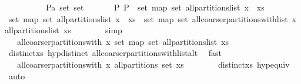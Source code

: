 \begin{isabellebody}
\ \ \isamarkupfalse%
\ \isanewline
\ \ \ \ \isamarkupfalse%
\ P{\isacharcolon}{\isacharcolon}{\isachardoublequoteopen}{\isacharprime}a\ set\ set{\isachardoublequoteclose}\ \isanewline
\ \ \ \ \isamarkupfalse%
\ P{\isacharcolon}\ {\isachardoublequoteopen}P\ {\isasymin}\ set\ {\isacharparenleft}map\ set\ {\isacharparenleft}all{\isacharunderscore}partitions{\isacharunderscore}list\ {\isacharparenleft}x\ {\isacharhash}\ xs{\isacharparenright}{\isacharparenright}{\isacharparenright}{\isachardoublequoteclose}\isanewline
\isanewline
\ \ \ \ \isamarkupfalse%
\ {\isachardoublequoteopen}set\ {\isacharparenleft}map\ set\ {\isacharparenleft}all{\isacharunderscore}partitions{\isacharunderscore}list\ {\isacharparenleft}x\ {\isacharhash}\ xs{\isacharparenright}{\isacharparenright}{\isacharparenright}\ {\isacharequal}\ set\ {\isacharparenleft}map\ set\ {\isacharparenleft}all{\isacharunderscore}coarser{\isacharunderscore}partitions{\isacharunderscore}with{\isacharunderscore}list\ x\ {\isacharparenleft}all{\isacharunderscore}partitions{\isacharunderscore}list\ xs{\isacharparenright}{\isacharparenright}{\isacharparenright}{\isachardoublequoteclose}\isanewline
\ \ \ \ \ \ \isamarkupfalse%
\ simp\isanewline
\ \ \ \ \isamarkupfalse%
\ \isamarkupfalse%
\ {\isachardoublequoteopen}{\isasymdots}\ {\isacharequal}\ all{\isacharunderscore}coarser{\isacharunderscore}partitions{\isacharunderscore}with\ x\ {\isacharparenleft}set\ {\isacharparenleft}map\ set\ {\isacharparenleft}all{\isacharunderscore}partitions{\isacharunderscore}list\ xs{\isacharparenright}{\isacharparenright}{\isacharparenright}{\isachardoublequoteclose}\isanewline
\ \ \ \ \ \ \isamarkupfalse%
\ distinct{\isacharunderscore}xs\ hyp{\isacharunderscore}distinct\ all{\isacharunderscore}coarser{\isacharunderscore}partitions{\isacharunderscore}with{\isacharunderscore}list{\isacharunderscore}alt\ \isamarkupfalse%
\ fast\isanewline
\ \ \ \ \isamarkupfalse%
\ \isamarkupfalse%
\ {\isachardoublequoteopen}{\isasymdots}\ {\isacharequal}\ all{\isacharunderscore}coarser{\isacharunderscore}partitions{\isacharunderscore}with\ x\ {\isacharparenleft}all{\isacharunderscore}partitions\ {\isacharparenleft}set\ xs{\isacharparenright}{\isacharparenright}{\isachardoublequoteclose}\isanewline
\ \ \ \ \ \ \isamarkupfalse%
\ distinct{\isacharunderscore}xs\ hyp{\isacharunderscore}equiv\ \isamarkupfalse%
\ auto\isanewline
\ \ \ \ \isamarkupfalse%

\end{isabellebody}
